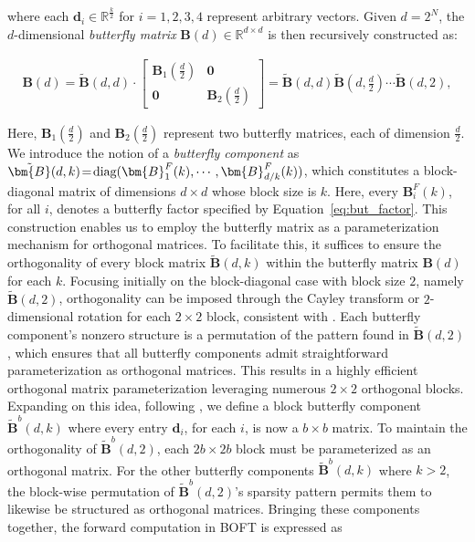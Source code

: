 where each $\bm{d}_i\in\mathbb{R}^{\frac{k}{2}}$ for $i=1,2,3,4$ represent arbitrary vectors. Given $d=2^N$, the $d$-dimensional \emph{butterfly matrix} $\bm{B}(d)\in\mathbb{R}^{d\times d}$ is then recursively constructed as:

\begin{equation}
\begin{aligned}
    \!\!\bm{B}(d)=\tilde{\bm{B}}(d,d)\!\cdot\!\begin{bmatrix}
    \bm{B}_1(\frac{d}{2})\!\!\!\!\! & \bm{0} \\
    \bm{0}\!\!\!\!\! &\bm{B}_2(\frac{d}{2})
    \end{bmatrix}= \tilde{\bm{B}}(d,d)\tilde{\bm{B}}(d,\frac{d}{2})\cdots\tilde{\bm{B}}(d,2),
\end{aligned}
\end{equation}

Here, $\bm{B}_1(\frac{d}{2})$ and $\bm{B}_2(\frac{d}{2})$ represent two butterfly matrices, each of dimension $\frac{d}{2}$. We introduce the notion of a \emph{butterfly component} as $\thickmuskip=2mu \medmuskip=2mu \tilde{\bm{B}}(d,k)=\text{diag}(\bm{B}^F_1(k),\cdots,\bm{B}^F_{d/k}(k))$, which constitutes a block-diagonal matrix of dimensions $d\times d$ whose block size is $k$. Here, every $\bm{B}^F_i(k)$, for all $i$, denotes a butterfly factor specified by Equation~\ref{eq:but_factor}. This construction enables us to employ the butterfly matrix as a parameterization mechanism for orthogonal matrices. To facilitate this, it suffices to ensure the orthogonality of every block matrix $\tilde{\bm{B}}(d,k)$ within the butterfly matrix $\bm{B}(d)$ for each $k$. Focusing initially on the block-diagonal case with block size $2$, namely $\tilde{\bm{B}}(d,2)$, orthogonality can be imposed through the Cayley transform or $2$-dimensional rotation for each $2\times2$ block, consistent with \cite{liu2021orthogonal,qiu2023controlling}. Each butterfly component’s nonzero structure is a permutation of the pattern found in $\tilde{\bm{B}}(d,2)$, which ensures that all butterfly components admit straightforward parameterization as orthogonal matrices. This results in a highly efficient orthogonal matrix parameterization leveraging numerous $2\times2$ orthogonal blocks. Expanding on this idea, following \cite{chen2022pixelated}, we define a block butterfly component $\tilde{\bm{B}}^b(d,k)$ where every entry $\bm{d}_i$, for each $i$, is now a $b\times b$ matrix. To maintain the orthogonality of $\tilde{\bm{B}}^b(d,2)$, each $2b\times2b$ block must be parameterized as an orthogonal matrix. For the other butterfly components $\tilde{\bm{B}}^b(d,k)$ where $k>2$, the block-wise permutation of $\tilde{\bm{B}}^b(d,2)$'s sparsity pattern permits them to likewise be structured as orthogonal matrices. Bringing these components together, the forward computation in BOFT is expressed as

